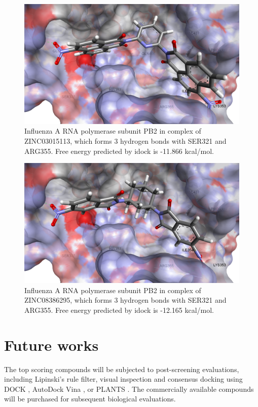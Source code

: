 \begin{figure}
\centering
\includegraphics[width=\linewidth]{../influenza/2VQZ-ZINC03015113.png}
\caption{Influenza A RNA polymerase subunit PB2 in complex of ZINC03015113, which forms 3 hydrogen bonds with SER321 and ARG355. Free energy predicted by idock is -11.866 kcal/mol.}
\label{influenza:2VQZ-ZINC03015113}
\end{figure}

\begin{figure}
\centering
\includegraphics[width=\linewidth]{../influenza/2VQZ-ZINC08386295.png}
\caption{Influenza A RNA polymerase subunit PB2 in complex of ZINC08386295, which forms 3 hydrogen bonds with SER321 and ARG355. Free energy predicted by idock is -12.165 kcal/mol.}
\label{influenza:2VQZ-ZINC08386295}
\end{figure}

\section{Future works}

The top scoring compounds will be subjected to post-screening evaluations, including Lipinski's rule filter, visual inspection and consensus docking using DOCK \citep{1222}, AutoDock Vina \citep{595}, or PLANTS \citep{610,607,779}. The commercially available compounds will be purchased for subsequent biological evaluations.

